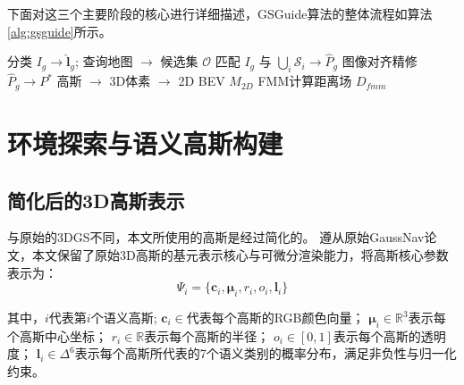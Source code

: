 下面对这三个主要阶段的核心进行详细描述，GSGuide算法的整体流程如算法\ref{alg:gsguide}所示。
\begin{algorithm}[h!]
    \small
    \SetAlgoLined
    \BlankLine
    \BlankLine
    分类 $I_g \rightarrow \hat{\boldsymbol{l}}_g$; 查询地图 $\rightarrow$ 候选集 $\mathcal{O}$\;
    匹配 $I_g$ 与 $\bigcup_i \mathcal{S}_i \rightarrow \hat{P}_g$\;
    图像对齐精修 $\hat{P}_g \rightarrow P^*$\;
    \BlankLine
    高斯 $\rightarrow$ 3D体素 $\rightarrow$ 2D BEV $M_{2D}$\;
    FMM计算距离场 $D_{fmm}$\;
    \caption{GSGuide: 基于语义增强3DGS的视觉导航算法}
    \label{alg:gsguide}
\end{algorithm}

\section{环境探索与语义高斯构建}
\subsection{简化后的3D高斯表示}
与原始的3DGS\cite{3DGS}不同，本文所使用的高斯是经过简化的。
遵从原始GaussNav论文，本文保留了原始3D高斯的基元表示核心与可微分渲染能力，将高斯核心参数表示为：
\begin{equation}
    \Psi_i=\{\boldsymbol{c}_i,\boldsymbol{\mu}_i,r_i,o_i,\boldsymbol{l}_i \}
\end{equation}

其中，$i$代表第$i$个语义高斯;
$\boldsymbol{c}_i\in$代表每个高斯的RGB颜色向量；
$\boldsymbol{\mu}_i\in \mathbb{R} ^{3}$表示每个高斯中心坐标；
$r_i\in \mathbb{R}$表示每个高斯的半径；
$o_i\in [0,1]$表示每个高斯的透明度；
$\boldsymbol{l}_i\in \Delta  ^{6}$表示每个高斯所代表的7个语义类别的概率分布，满足非负性与归一化约束。

